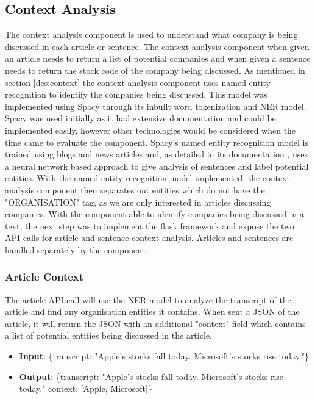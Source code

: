         
        \subsection{Context Analysis}
        The context analysis component is used to understand what company is being discussed in each article or sentence. The context analysis component when given an article needs to return a list of potential companies and when given a sentence needs to return the stock code of the company being discussed. As mentioned in section \ref{des:context} the context analysis component uses named entity recognition to identify the companies being discussed. This model was implemented using Spacy \cite{technology:Spacy} through its inbuilt word tokenization and NER model. Spacy was used initially as it had extensive documentation and could be implemented easily, however other technologies would be considered when the time came to evaluate the component. Spacy's named entity recognition model is trained using blogs and news articles and, as detailed in its documentation \cite{spacy_ner}, uses a neural network based approach to give analysis of sentences and label potential entities. With the named entity recognition model implemented, the context analysis component then separates out entities which do not have the "ORGANISATION" tag, as we are only interested in articles discussing companies. With the component able to identify companies being discussed in a text, the next step was to implement the flask framework and expose the two API calls for article and sentence context analysis. Articles and sentences are handled separately by the component:
        
            \subsubsection{Article Context}
            The article API call will use the NER model to analyze the transcript of the article and find any organisation entities it contains. When sent a JSON of the article, it will return the JSON with an additional "context" field which contains a list of potential entities being discussed in the article.
            
            \begin{itemize}
                \item \textbf{Input}: \{transcript: "Apple's stocks fall today. Microsoft's stocks rise today."\} 
                \item \textbf{Output}: \{transcript: "Apple's stocks fall today. Microsoft's stocks rise today." context: [Apple, Microsoft]\} 
            \end{itemize}
            
